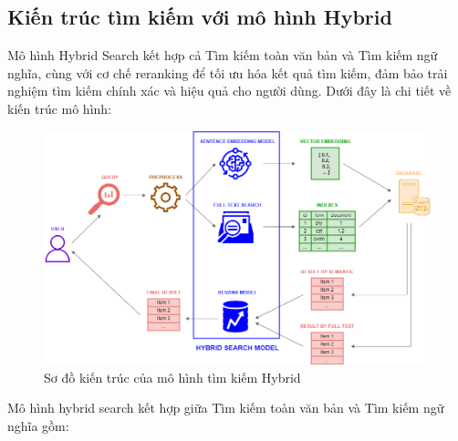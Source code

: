 \subsection{Kiến trúc tìm kiếm với mô hình Hybrid}
Mô hình Hybrid Search kết hợp cả Tìm kiếm toàn văn bản và Tìm kiếm ngữ nghĩa, cùng với cơ chế reranking để tối ưu hóa kết quả tìm kiếm, đảm bảo trải nghiệm tìm kiếm chính xác và hiệu quả cho người dùng. Dưới đây là chi tiết về kiến trúc mô hình:
\begin{figure}[H]
    \centering
    \includegraphics[width=\textwidth]{Images/HybridSearch/SearchArchitecture.png}
    \caption{Sơ đồ kiến trúc của mô hình tìm kiếm Hybrid}
\end{figure}
Mô hình hybrid search kết hợp giữa Tìm kiếm toàn văn bản và Tìm kiếm ngữ nghĩa gồm:
